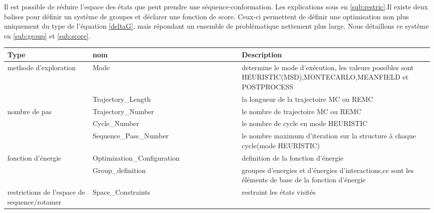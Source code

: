 \begin{enumerate}
Il est possible de réduire l'espace des états que peut prendre une séquence-conformation. Les explications sous en \ref{sub:restric}.Il existe deux balises pour définir un système de groupes et déclarer une fonction de score. Ceux-ci permettent de définir une optimisation non plus uniquement du type de l'équation \ref{deltaG}, mais répondant un ensemble de problématique nettement plus large. Nous détaillons ce système  en \ref{sub:group} et \ref{sub:score}.

    \begin{table}[!htbp]
      \centering

      \begin{tabular}{|p{0.2\linewidth}|p{0.35\linewidth}|p{0.45\linewidth}|}

        \hline
        Type   & nom & Description \\
        \hline
          methode  d'exploration & Mode &  determine  le mode d'exécution, les valeurs possibles sont HEURISTIC(MSD),MONTECARLO,MEANFIELD et POSTPROCESS  \\  \hline    
                        & Trajectory\_Length  &  la longueur de la trajectoire MC ou REMC\\  \cline{2-3}
        nombre de pas & Trajectory\_Number  &  le nombre de trajectoire  MC ou REMC  \\  \cline{2-3}
                        & Cycle\_Number  &    le nombre de cycle en mode HEURISTIC   \\ \cline{2-3}  
                        & Sequence\_Pass\_Number  &  le nombre maximum d'iteration sur  la structure à chaque cycle(mode HEURISTIC)    \\ \hline  

        fonction d'énergie &  Optimization\_Configuration &   definition de la fonction d'énergie\\               \cline{2-3}
                        &  Group\_definition &   groupes  d'energies et d'énergies d'interactions,ce sont les éléments de base de la fonction d'énergie\\  \hline  
        restrictions de l'espace de  sequence/rotamer & Space\_Constraints   &  restraint les états visités \\ \hline                
                         

\end{tabular}
\end{table}
\end{enumerate}
